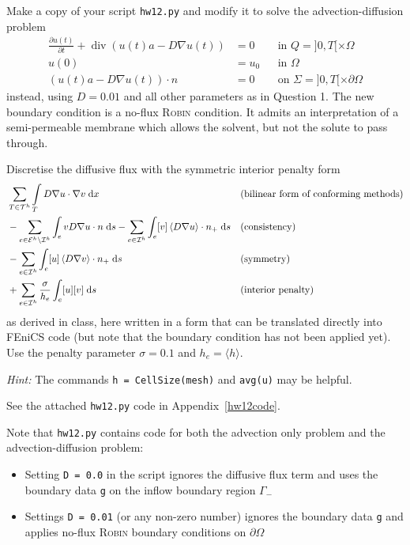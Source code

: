 Make a copy of your script \texttt{hw12.py} and modify it to solve the advection-diffusion problem
\begin{subequations}\label{eq:advection-diffusion}
\begin{align}
\frac{\partial u(t)}{\partial t} + \operatorname{div} (u(t)a - D\nabla u(t)) &= 0 && \text{in } Q = ]0,T[ \times \Omega\\
u(0) &= u_0 && \text{in } \Omega\\
\left(u(t)a-D\nabla u(t)\right) \cdot n &= 0 && \text{on } \Sigma = ]0,T[ \times \partial\Omega
\end{align}
\end{subequations}
instead, using $D = 0.01$ and all other parameters as in Question 1. The new boundary condition is a no-flux \textsc{Robin} condition. It admits an interpretation of a semi-permeable membrane which allows the solvent, but not the solute to pass through.

Discretise the diffusive flux with the symmetric interior penalty form
\begin{align*}
&\sum_{T\in\mathcal{T}^h} \int\limits_T D\nabla u \cdot \nabla v \;\mathrm{d}x && \text{(bilinear form of conforming methods)}\\
&- \sum_{e\in\mathcal{E}^h\setminus\mathcal{I}^h} \int_e vD\nabla u \cdot n \;\mathrm{d}s - \sum_{e\in\mathcal{I}^h} \int_e [v]\left\langle D\nabla u\right\rangle\cdot n_+ \;\mathrm{d}s && \text{(consistency)}\\
&- \sum_{e\in\mathcal{I}^h} \int_e [u]\left\langle D\nabla v\right\rangle\cdot n_+ \;\mathrm{d}s && \text{(symmetry)}\\
&+ \sum_{e\in\mathcal{I}^h} \frac{\sigma}{h_e} \int_e [u] [v] \;\mathrm{d}s && \text{(interior penalty)}
\end{align*}
as derived in class, here written in a form that can be translated directly into \textsf{FEniCS} code (but note that the boundary condition has not been applied yet). Use the penalty parameter $\sigma = 0.1$ and $h_e = \langle h \rangle$.

\emph{Hint:} The commands \verb|h = CellSize(mesh)| and \verb|avg(u)| may be helpful.

\vspace{0.5cm}
\begin{solution}
See the attached \texttt{hw12.py} code in Appendix~\ref{hw12code}.

Note that \texttt{hw12.py} contains code for both the advection only problem and the advection-diffusion problem:
\begin{itemize}
\item Setting \texttt{D = 0.0} in the script ignores the diffusive flux term and uses the boundary data \texttt{g} on the inflow boundary region $\Gamma_-$
\item Settings \texttt{D = 0.01} (or any non-zero number) ignores the boundary data \texttt{g} and applies no-flux \textsc{Robin} boundary conditions on $\partial\Omega$
\end{itemize}
\end{solution}
\vspace{1cm}

